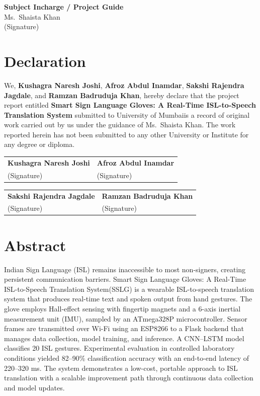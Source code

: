 \documentclass[12pt,a4paper]{report}
\newcommand{\SystemName}{Smart Sign Language Gloves: A Real-Time ISL-to-Speech Translation System}
\newcommand{\SystemAcronym}{SSLG}
\newcommand{\UniversityName}{University of Mumbai}
\newcommand{\TeamMemberA}{Kushagra Naresh Joshi}
\newcommand{\TeamMemberB}{Afroz Abdul Inamdar}
\newcommand{\TeamMemberC}{Sakshi Rajendra Jagdale}
\newcommand{\TeamMemberD}{Ramzan Badruduja Khan}
\newcommand{\GuideName}{Ms.\ Shaista Khan}
\begin{document}
\vspace{1in}
\textbf{Subject Incharge / Project Guide}\\
\GuideName\\
(Signature)

\cleardoublepage

\chapter*{Declaration}
We, \textbf{\TeamMemberA}, \textbf{\TeamMemberB}, \textbf{\TeamMemberC}, and
\textbf{\TeamMemberD}, hereby declare that the project report entitled
\textbf{\SystemName} submitted to \UniversityName is a record of original work
carried out by us under the guidance of \GuideName. The work reported
herein has not been submitted to any other University or Institute for
any degree or diploma.

\vspace{1in}
\begin{tabularx}{\textwidth}{X X}
\textbf{\TeamMemberA} & \textbf{\TeamMemberB} \\
(Signature) & (Signature) \\
\end{tabularx}

\vspace{0.5in}
\begin{tabularx}{\textwidth}{X X}
\textbf{\TeamMemberC} & \textbf{\TeamMemberD} \\
(Signature) & (Signature) \\
\end{tabularx}

\cleardoublepage

\chapter*{Abstract}
Indian Sign Language (ISL) remains inaccessible to most non-signers, creating
persistent communication barriers. \SystemName (\SystemAcronym) is a wearable
ISL-to-speech translation system that produces real-time text and spoken output
from hand gestures. The glove employs Hall-effect sensing with fingertip magnets
and a 6-axis inertial measurement unit (IMU), sampled by an ATmega328P
microcontroller. Sensor frames are transmitted over Wi-Fi using an ESP8266 to a
Flask backend that manages data collection, model training, and inference. A
CNN--LSTM model classifies 20 ISL gestures. Experimental evaluation in controlled
laboratory conditions yielded 82--90\% classification accuracy with an end-to-end
latency of 220--320 ms. The system demonstrates a low-cost, portable approach to
ISL translation with a scalable improvement path through continuous data
collection and model updates.
\end{document}
